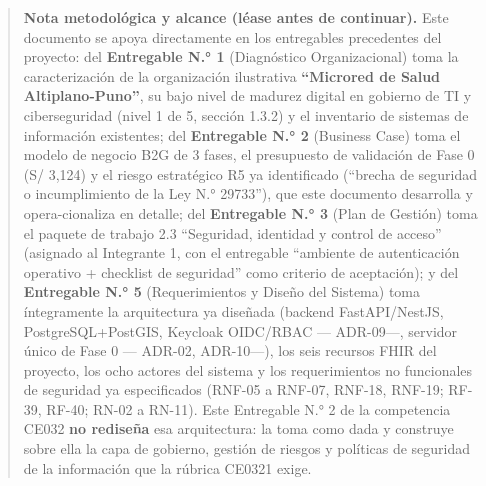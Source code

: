 \documentclass[11pt,a4paper]{article}
\begin{document}
\begin{quote}
\textbf{Nota metodológica y alcance (léase antes de continuar).} Este documento se apoya directamente en los entregables precedentes del proyecto: del \textbf{Entregable N.° 1} (Diagnóstico Organizacional) toma la caracterización de la organización ilustrativa \textbf{``Microred de Salud Altiplano-Puno''}, su bajo nivel de madurez digital en gobierno de TI y ciberseguridad (nivel 1 de 5, sección 1.3.2) y el inventario de sistemas de información existentes; del \textbf{Entregable N.° 2} (Business Case) toma el modelo de negocio B2G de 3 fases, el presupuesto de validación de Fase 0 (S/ 3,124) y el riesgo estratégico R5 ya identificado (``brecha de seguridad o incumplimiento de la Ley N.° 29733''), que este documento desarrolla y opera-cionaliza en detalle; del \textbf{Entregable N.° 3} (Plan de Gestión) toma el paquete de trabajo 2.3 ``Seguridad, identidad y control de acceso'' (asignado al Integrante 1, con el entregable ``ambiente de autenticación operativo + checklist de seguridad'' como criterio de aceptación); y del \textbf{Entregable N.° 5} (Requerimientos y Diseño del Sistema) toma íntegramente la arquitectura ya diseñada (backend FastAPI/NestJS, PostgreSQL+PostGIS, Keycloak OIDC/RBAC --- ADR-09---, servidor único de Fase 0 --- ADR-02, ADR-10---), los seis recursos FHIR del proyecto, los ocho actores del sistema y los requerimientos no funcionales de seguridad ya especificados (RNF-05 a RNF-07, RNF-18, RNF-19; RF-39, RF-40; RN-02 a RN-11). Este Entregable N.° 2 de la competencia CE032 \textbf{no rediseña} esa arquitectura: la toma como dada y construye sobre ella la capa de gobierno, gestión de riesgos y políticas de seguridad de la información que la rúbrica CE0321 exige.


\end{quote}
\end{document}
